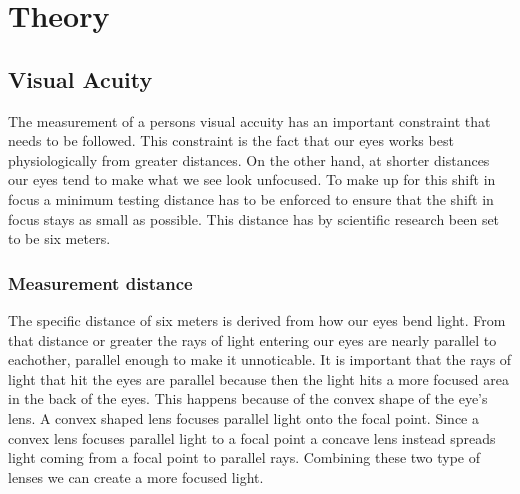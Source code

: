 \documentclass[12pt,a4paper,notitlepage]{report}
\begin{document}
%

\chapter{Theory}
\section{Visual Acuity}
The measurement of a persons visual accuity has an important constraint that needs to be followed. This constraint is the fact that our eyes works best physiologically from greater distances. On the other hand, at shorter distances our eyes tend to make what we see look unfocused. To make up for this shift in focus a minimum testing distance has to be enforced to ensure that the shift in focus stays as small as possible. This distance has by scientific research been set to be six meters.

\subsection{Measurement distance}
The specific distance of six meters is derived from how our eyes bend light. From that distance or greater the rays of light entering our eyes are nearly parallel to eachother, parallel enough to make it unnoticable. It is important that the rays of light that hit the eyes are parallel because then the light hits a more focused area in the back of the eyes. This happens because of the convex shape of the eye's lens. A convex shaped lens focuses parallel light onto the focal point. Since a convex lens focuses parallel light to a focal point a concave lens instead spreads light coming from a focal point to parallel rays. Combining these two type of lenses we can create a more focused light. 
\end{document}
